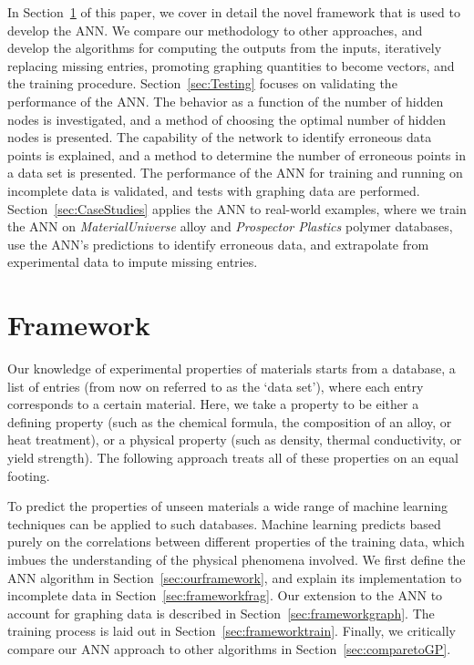 \documentclass[review]{elsarticle}
\newcommand{\secref}[1]{Section~\ref{#1}}
\begin{document}
In \secref{sec:formalism} of this paper, we cover in detail the novel
framework that is used to develop the ANN. We compare our methodology to
other approaches, and develop the algorithms for computing the outputs from
the inputs, iteratively replacing missing entries, promoting graphing
quantities to become vectors, and the training
procedure. \secref{sec:Testing} focuses on validating the performance of the
ANN. The behavior as a function of the number of hidden nodes is
investigated, and a method of choosing the optimal number of hidden nodes is
presented. The capability of the network to identify erroneous data points
is explained, and a method to determine the number of erroneous points in a
data set is presented. The performance of the ANN for training and running
on incomplete data is validated, and tests with graphing data are
performed. \secref{sec:CaseStudies} applies the ANN to real-world examples,
where we train the ANN on \textit{MaterialUniverse}\cite{MaterialUniverse}
alloy and \textit{Prospector Plastics}\cite{ProspectorPlastics} polymer
databases, use the ANN's predictions to identify erroneous data, and
extrapolate from experimental data to impute missing entries.

\section{Framework}\label{sec:formalism}

Our knowledge of experimental properties of materials starts from a
database, a list of entries (from now on referred to as the `data set'),
where each entry corresponds to a certain material. Here, we take a property
to be either a defining property (such as the chemical formula, the
composition of an alloy, or heat treatment), or a physical property (such as
density, thermal conductivity, or yield strength)\cite{Ashby04}. The
following approach treats all of these properties on an equal footing.

To predict the properties of unseen materials a wide range of machine
learning techniques can be applied to such databases\cite{Oliveira16}.
Machine learning predicts based purely on the correlations between different
properties of the training data, which imbues the understanding of the
physical phenomena involved. We first define the ANN algorithm in
\secref{sec:ourframework}, and explain its implementation to incomplete data
in \secref{sec:frameworkfrag}.  Our extension to the ANN to account for
graphing data is described in \secref{sec:frameworkgraph}. The training
process is laid out in \secref{sec:frameworktrain}. Finally, we critically
compare our ANN approach to other algorithms in \secref{sec:comparetoGP}.
\end{document}
